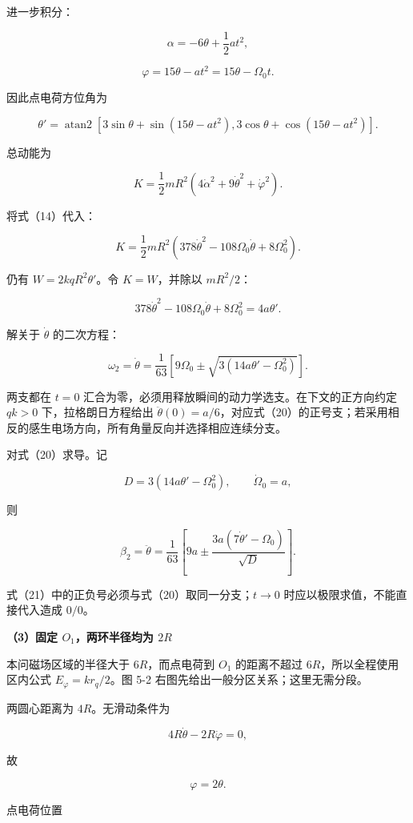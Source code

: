 \documentclass[12pt,a4paper,UTF8]{ctexart}
\begin{document}
进一步积分：

\[\alpha=-6\theta+\frac12at^2,\]

\[\varphi=15\theta-at^2=15\theta-\Omega_0t. \tag{15}\]

因此点电荷方位角为

\[\boxed{
\theta'=\operatorname{atan2}
\left[3\sin\theta+\sin(15\theta-at^2),
3\cos\theta+\cos(15\theta-at^2)
\right]
}. \tag{16}\]

总动能为

\[K=\frac12mR^2
\left(4\dot\alpha^2+9\dot\theta^2+\dot\varphi^2\right). \tag{17}\]

将式（14）代入：

\[K=\frac12mR^2
\left(378\dot\theta^2-108\Omega_0\dot\theta+8\Omega_0^2\right). \tag{18}\]

仍有 \(W=2kqR^2\theta'\)。令 \(K=W\)，并除以 \(mR^2/2\)：

\[378\dot\theta^2-108\Omega_0\dot\theta+8\Omega_0^2
=4a\theta'. \tag{19}\]

解关于 \(\dot\theta\) 的二次方程：

\[\boxed{
\omega_2=\dot\theta
=\frac1{63}\left[
9\Omega_0\pm\sqrt{3(14a\theta'-\Omega_0^2)}
\right]
}. \tag{20}\]

两支都在 \(t=0\)
汇合为零，必须用释放瞬间的动力学选支。在下文的正方向约定 \(qk>0\)
下，拉格朗日方程给出
\(\ddot\theta(0)=a/6\)，对应式（20）的正号支；若采用相反的感生电场方向，所有角量反向并选择相应连续分支。

对式（20）求导。记

\[D=3(14a\theta'-\Omega_0^2),\qquad \dot\Omega_0=a,\]

则

\[\boxed{
\beta_2=\ddot\theta
=\frac1{63}\left[
9a\pm\frac{3a(7\dot\theta'-\Omega_0)}{\sqrt D}
\right]
}. \tag{21}\]

式（21）中的正负号必须与式（20）取同一分支；\(t\to0\)
时应以极限求值，不能直接代入造成 \(0/0\)。

\textbf{（3）固定 \(O_1\)，两环半径均为 \(2R\)}

本问磁场区域的半径大于 \(6R\)，而点电荷到 \(O_1\) 的距离不超过
\(6R\)，所以全程使用区内公式 \(E_\varphi=kr_q/2\)。图 5-2
右图先给出一般分区关系；这里无需分段。

两圆心距离为 \(4R\)。无滑动条件为

\[4R\dot\theta-2R\dot\varphi=0,\]

故

\[\boxed{\varphi=2\theta}. \tag{22}\]

点电荷位置
\end{document}
